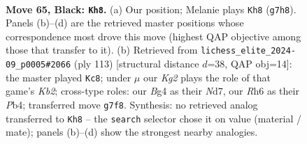 \documentclass[11pt]{article}
\begin{document}
\clearpage

\begin{figure}[p]\centering
\begin{subfigure}{0.46\textwidth}\centering
\resizebox{\linewidth}{!}{%
\newchessgame
\chessboard[
  setfen={8/1R4k1/7r/8/r5bB/6R1/2n2P2/7K b - - 10 65},
  showmover=false,
  pgfstyle=straightmove, color=movearrow, markmove={g7-h8}
]}
\caption{}
\end{subfigure}\hfill
\begin{subfigure}{0.46\textwidth}\centering
\resizebox{\linewidth}{!}{%
\newchessgame
\chessboard[
  setfen={8/1k1n1R2/6R1/3r4/1p4p1/8/7P/2K5 b - - 10 57},
  showmover=false,
  pgfstyle=straightmove, color=movearrow, markmove={b7-c8}
]}
\caption{}
\end{subfigure}
\\[4pt]

\caption{\textbf{Move 65, Black: \texttt{Kh8}.} (a) Our position; Melanie plays \texttt{Kh8} (\texttt{g7h8}). Panels (b)--(d) are the retrieved master positions whose correspondence most drove this move (highest QAP objective among those that transfer to it). (b) Retrieved from \texttt{lichess\_elite\_2024-09\_p0005\#2066} (ply 113) [structural distance $d$=38, QAP obj=14]: the master played \texttt{Kc8}; under $\mu$ our \emph{Kg2} plays the role of that game's \emph{Kb2}; cross-type roles: our \emph{B}g4 as their \emph{N}d7, our \emph{R}h6 as their \emph{P}b4; transferred move \texttt{g7f8}. Synthesis: no retrieved analog transferred to \texttt{Kh8} -- the \texttt{search} selector chose it on value (material / mate); panels (b)--(d) show the strongest nearby analogies.}
\label{fig:thought-m129}
\end{figure}

\clearpage
\end{document}
